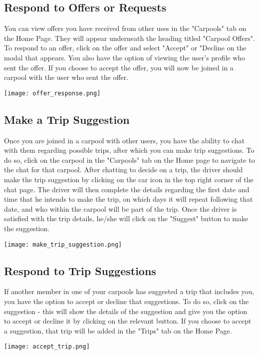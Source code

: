 \documentclass[12pt]{article}
\begin{document}
\subsection{Respond to Offers or Requests}
You can view offers you have received from other uses in the "Carpools" tab on the Home Page. They will appear underneath the heading titled "Carpool Offers". To respond to an offer, click on the offer and select "Accept" or "Decline on the modal that appears. You also have the option of viewing the user's profile who sent the offer. If you choose to accept the offer, you will now be joined in a carpool with the user who sent the offer. 
\begin{center}
\texttt{[image: offer\_response.png]}
\end{center}

\subsection{Make a Trip Suggestion}
Once you are joined in a carpool with other users, you have the ability to chat with them regarding possible trips, after which you can make trip suggestions. To do so, click on the carpool in the "Carpools" tab on the Home page to navigate to the chat for that carpool. After chatting to decide on a trip, the driver should make the trip suggestion by clicking on the car icon in the top right corner of the chat page. The driver will then complete the details regarding the first date and time that he intends to make the trip, on which days it will repeat following that date, and who within the carpool will be part of the trip. Once the driver is satisfied with the trip details, he/she will click on the "Suggest" button to make the suggestion.
\begin{center}
\texttt{[image: make\_trip\_suggestion.png]}
\end{center}

\subsection{Respond to Trip Suggestions}
If another member in one of your carpools has suggested a trip that includes you, you have the option to accept or decline that suggestions. To do so, click on the suggestion - this will show the details of the suggestion and give you the option to accept or decline it by clicking on the relevant button. If you choose to accept a suggestion, that trip will be added in the "Trips" tab on the Home Page.
\begin{center}
\texttt{[image: accept\_trip.png]}
\end{center}
\end{document}
